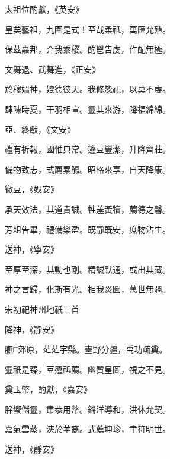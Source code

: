 \begin{pinyinscope}
 太祖位酌獻，《英安》



 皇矣藝祖，九圍是式！至哉柔祗，萬匯允殖。



 保茲嘉邦，介我黍稷。酌鬯告虔，作配無極。



 文舞退、武舞進，《正安》



 於穆媼神，媲德彼天。我修毖祀，以莫不虔。



 肆陳時夏，干羽相宣。靈其來游，降福綿綿。



 亞、終獻，《文安》



 禮有祈報，國惟典常。籩豆豐潔，升降齊莊。



 備物致志，式薦累觴。昭格來享，自天降康。



 徹豆，《娛安》



 承天效法，其道貴誠。牲羞黃犢，薦德之馨。



 芳俎告畢，禮備樂盈。既靜既安，庶物沾生。



 送神，《寧安》



 至厚至深，其動也剛。精誠默通，或出其藏。



 神之言歸，化斯有光。相我炎圖，萬世無疆。



 宋初祀神州地祇三首



 降神，《靜安》



 膴□郊原，茫茫宇縣。畫野分疆，禹功疏奠。



 靈祇是臻，豆籩祗薦。幽贊皇圖，視之不見。



 奠玉幣，酌獻，《嘉安》



 肸蠁儲靈，肅恭用幣。鏘洋導和，洪休允契。



 嘉氣雲蒸，浹於華裔。式薦坤珍，聿符明世。



 送神，《靜安》




\end{pinyinscope}
